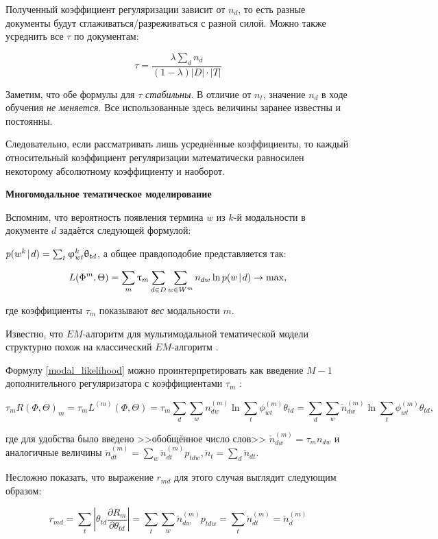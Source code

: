 Полученный коэффициент регуляризации зависит от $n_d$, то есть разные документы будут сглаживаться/разреживаться с разной силой. Можно также усреднить все $\tau$ по документам:

\[
\tau = \frac{\lambda \sum_d n_d }{(1-\lambda) |D| \cdot |T|}
\]

Заметим, что обе формулы для $\tau$ \textit{стабильны}. В отличие от $n_t$, значение $n_d$ в ходе обучения \emph{не меняется}. Все использованные здесь величины заранее известны и постоянны.

Следовательно, если рассматривать лишь усреднённые коэффициенты, то каждый относительный коэффициент регуляризации математически равносилен некоторому абсолютному коэффициенту и наоборот.

\textbf{Многомодальное тематическое моделирование}

Вспомним, что вероятность появления термина $w$ из $k$-й модальности в документе $d$ задаётся следующей формулой:

$p(w^k \mspace{2mu}{|}\mspace{2mu} d) = \sum_t \upvarphi_{wt}^k \uptheta_{td}$, а общее правдоподобие представляется так:

\[
L(\Phi^m, \Theta) = \sum_m \uptau_m \sum_{d\in D} \sum_{w \in W^m} n_{dw} \ln p(w \mspace{2mu}{|}\mspace{2mu} d) \rightarrow \max, \label{modal_likelihood}
\]

где коэффициенты $\tau_m$ показывают \textit{вес} модальности $m$.

Известно, что $EM$-алгоритм для мультимодальной тематической модели структурно похож на классический $EM$-алгоритм \cite{yanina}\cite{vorontsov2015non}\cite{bulatov}.

Формулу \ref{modal_likelihood} можно проинтерпретировать как введение $M-1$ дополнительного регуляризатора с коэффициентами $\tau_m$ \cite{yanina}:

\[
\tau_m R(\Phi, \Theta)_m = \tau_m L^{(m)}(\Phi, \Theta) = \tau_m  \sum_d \sum_w n_{dw}^{(m)} \ln \sum_t \phi_{wt}^{(m)}\theta_{td} =
\sum_d \sum_w \check{n}_{dw}^{(m)} \ln \sum_t \phi_{wt}^{(m)}\theta_{td},
\]

где для удобства было введено >>обобщённое число слов>> $\check{n}_{dw}^{(m)} = \tau_m n_{dw}$ и аналогичные величины $\check{n}_{dt}^{(m)} = \sum_w \check{n}_{dt}^{(m)} p_{tdw}, \check{n}_t = \sum_d \check{n}_{dt}$.

Несложно показать, что выражение $r_{md}$ для этого случая выглядит следующим образом:

\[
r_{md} = \sum_t |\theta_{td} \frac{\partial R_m}{\partial \theta_{td}}| = \sum_t \sum_w \check{n}_{dw}^{(m)} p_{tdw} = \sum_t  \check{n}_{dt}^{(m)} = \check{n}_{d}^{(m)}
\]

